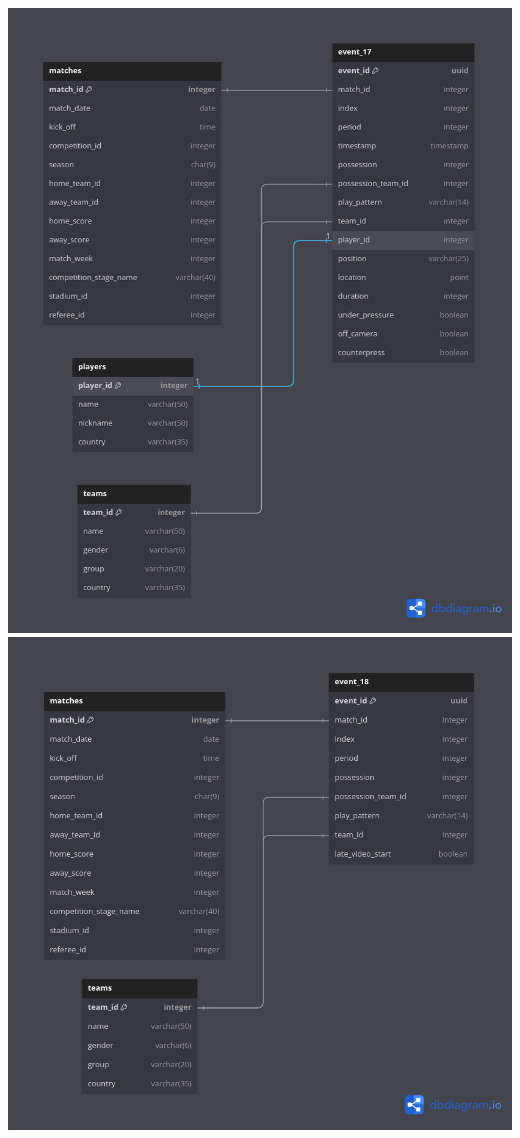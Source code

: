 \documentclass[12pt]{article}
\begin{document}
\includegraphics[width=\textwidth]{schema-diagram/event_17.png}
\includegraphics[width=\textwidth]{schema-diagram/event_18.png}
\end{document}
